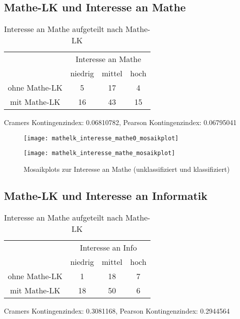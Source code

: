 \documentclass[paper=a4,                 %
               fontsize=12pt,            %
               parskip=half,             %
               ngerman,                 %
               ]{scrartcl}
\begin{document}
\newpage
\subsection{Mathe-LK und Interesse an Mathe}
\begin{table}[h]
\begin{center}
\begin{tabular}{c|c|c|c}
&  \multicolumn{3}{c}{Interesse an Mathe}   \\
&  niedrig & mittel & hoch\\
\hline
ohne Mathe-LK & 5  & 17 & 4  \\
 mit Mathe-LK &16 & 43 &15  \\
\end{tabular}
\caption{Interesse an Mathe aufgeteilt nach Mathe-LK}
Cramers Kontingenzindex:  0.06810782, Pearson Kontingenzindex:  0.06795041
\end{center}
\end{table}

\begin{figure}[ht]
   \begin{minipage}{.4\textwidth}
      \texttt{[image: mathelk\_interesse\_mathe0\_mosaikplot]}
   \end{minipage}
   \hspace{.1\linewidth}%
   \begin{minipage}{.4\textwidth} %
	\texttt{[image: mathelk\_interesse\_mathe\_mosaikplot]}
   \end{minipage}
   \caption{Mosaikplots zur Interesse an Mathe (unklassifiziert und klassifiziert)}
\end{figure}

\newpage
\subsection{Mathe-LK und Interesse an Informatik}
\begin{table}[h]
\begin{center}
\begin{tabular}{c|c|c|c}
&  \multicolumn{3}{c}{Interesse an Info}    \\
&  niedrig & mittel & hoch\\
\hline
 ohne Mathe-LK & 1 & 18 & 7\\
 mit Mathe-LK & 18 & 50 & 6\\
\end{tabular}
\caption{Interesse an Mathe aufgeteilt nach Mathe-LK}
Cramers Kontingenzindex:  0.3081168, Pearson Kontingenzindex:  0.2944564 
\end{center}
\end{table}
\end{document}
